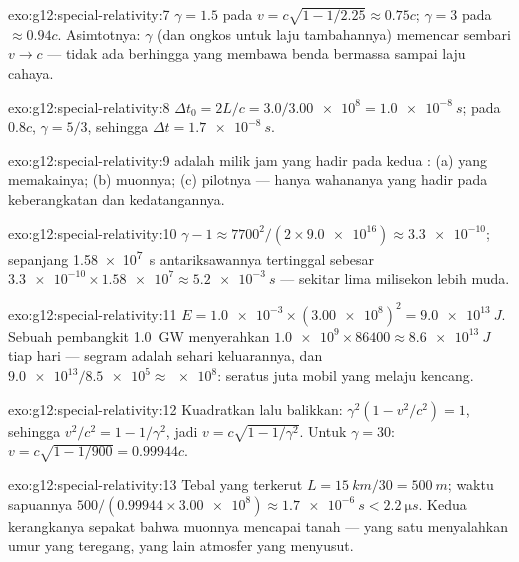 \begin{solution}{exo:g12:special-relativity:7}
$\gamma = 1.5$ pada $v = c\sqrt{1 - 1/2.25} \approx 0.75c$;
$\gamma = 3$ pada $\approx 0.94c$. Asimtotnya: $\gamma$ (dan ongkos
 untuk laju tambahannya) memencar sembari $v \to c$ --- tidak ada 
berhingga yang membawa benda bermassa sampai laju cahaya.
\end{solution}

\begin{solution}{exo:g12:special-relativity:8}
$\Delta t_0 = 2L/c = 3.0/\num{3.00e8} = \qty{1.0e-8}{s}$; pada $0.8c$,
$\gamma = 5/3$, sehingga $\Delta t = \qty{1.7e-8}{s}$.
\end{solution}

\begin{solution}{exo:g12:special-relativity:9}
 adalah milik jam yang hadir pada kedua : (a) yang
memakainya; (b) muonnya; (c) pilotnya --- hanya wahananya yang hadir pada
keberangkatan dan kedatangannya.
\end{solution}

\begin{solution}{exo:g12:special-relativity:10}
$\gamma - 1 \approx 7700^2/(2 \times \num{9.0e16}) \approx
\num{3.3e-10}$; sepanjang \qty{1.58e7}{s} antariksawannya tertinggal sebesar
$\num{3.3e-10} \times \num{1.58e7} \approx \qty{5.2e-3}{s}$ --- sekitar
lima milisekon lebih muda.
\end{solution}

\begin{solution}{exo:g12:special-relativity:11}
$E = \num{1.0e-3} \times (\num{3.00e8})^2 = \qty{9.0e13}{J}$. Sebuah
pembangkit \qty{1.0}{GW} menyerahkan $\num{1.0e9} \times 86400 \approx
\qty{8.6e13}{J}$ tiap hari --- segram adalah sehari keluarannya, dan
$\num{9.0e13}/\num{8.5e5} \approx \num{e8}$: seratus juta
mobil yang melaju kencang.
\end{solution}

\begin{solution}{exo:g12:special-relativity:12}
Kuadratkan lalu balikkan: $\gamma^2(1 - v^2/c^2) = 1$, sehingga
$v^2/c^2 = 1 - 1/\gamma^2$, jadi $v = c\sqrt{1 - 1/\gamma^2}$. Untuk
$\gamma = 30$: $v = c\sqrt{1 - 1/900} = 0.99944c$.
\end{solution}

\begin{solution}{exo:g12:special-relativity:13}
Tebal yang terkerut $L = \qty{15}{km}/30 = \qty{500}{m}$; waktu sapuannya
$500/(0.99944 \times \num{3.00e8}) \approx \qty{1.7e-6}{s} <
\qty{2.2}{\micro s}$. Kedua kerangkanya sepakat bahwa muonnya mencapai tanah ---
yang satu menyalahkan umur yang teregang, yang lain atmosfer yang menyusut.
\end{solution}


